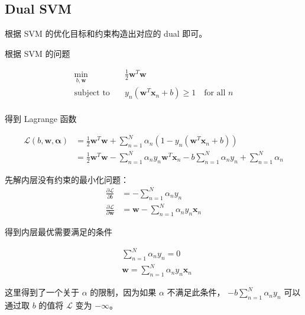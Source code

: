 \documentclass[a4paper]{article}
\begin{document}
\subsection{Dual SVM}
根据 SVM 的优化目标和约束构造出对应的 dual 即可。

根据 SVM 的问题

\begin{equation}
\begin{aligned}
\min_{b, \mathbf{w}} \quad& \frac{1}{2}\mathbf{w}^{T}\mathbf{w} \\
\text{subject to} \quad& y_n(\mathbf{w}^{T}\mathbf{x}_n + b) \ge 1 \quad \text{for all } n\\
\end{aligned}
\end{equation}

得到 Lagrange 函数

\begin{equation}
\begin{aligned}
\mathcal{L}(b, \mathbf{w}, \bm{\alpha}) &= \frac{1}{2}\mathbf{w}^{T}\mathbf{w} + \sum_{n=1}^{N}\alpha_n(1 - y_n(\mathbf{w}^{T}\mathbf{x}_n + b)) \\
                                            &= \frac{1}{2}\mathbf{w}^{T}\mathbf{w} - \sum_{n=1}^{N}\alpha_n y_n \mathbf{w}^{T}\mathbf{x}_n - b \sum_{n=1}^{N}\alpha_n y_n + \sum_{n=1}^{N}\alpha_n
\end{aligned}
\end{equation}

先解内层没有约束的最小化问题：
\begin{equation}
\begin{aligned}
\frac{\partial\mathcal{L}}{\partial b} &= -\sum_{n=1}^{N}\alpha_n y_n \\
\frac{\partial\mathcal{L}}{\partial \mathbf{w}} &= \mathbf{w} - \sum_{n=1}^{N}\alpha_n y_n \mathbf{x}_n
\end{aligned}
\end{equation}

得到内层最优需要满足的条件

\begin{equation}
\begin{aligned}
& \sum_{n=1}^{N}\alpha_n y_n = 0\\
& \mathbf{w} = \sum_{n=1}^{N}\alpha_n y_n \mathbf{x}_n
\end{aligned}
\end{equation}

这里得到了一个关于 $\alpha$ 的限制，因为如果 $\alpha$ 不满足此条件，
$-b \sum_{n=1}^{N}\alpha_n y_n$ 可以通过取 $b$ 的值将 $\mathcal{L}$ 变为 $-\infty$。
\end{document}
